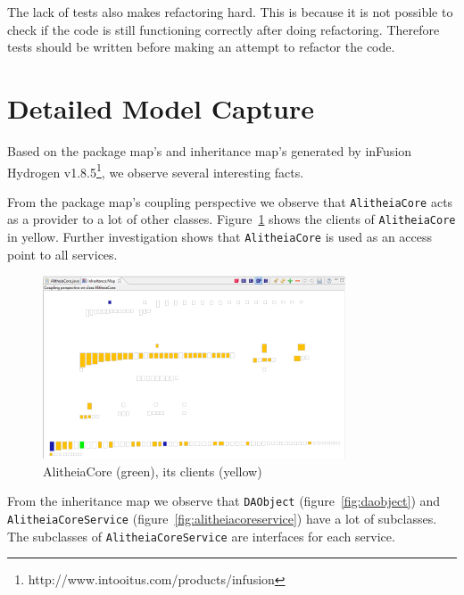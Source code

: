 \documentclass{article}
\begin{document}
The lack of tests also makes refactoring hard. This is because it is not possible to check if the code is still functioning correctly after doing refactoring. Therefore tests should be written before making an attempt to refactor the code.

\section{Detailed Model Capture}
Based on the package map's and inheritance map's generated by inFusion Hydrogen v1.8.5\footnote{http://www.intooitus.com/products/infusion}, we observe several interesting facts.

From the package map's coupling perspective we observe that \verb|AlitheiaCore| acts as a provider to a lot of other classes. Figure~\ref{fig:alitheiacore} shows the clients of \verb|AlitheiaCore| in yellow. Further investigation shows that \verb|AlitheiaCore| is used as an access point to all services.

\begin{figure}[h]
    \centering
    \includegraphics[width=0.8\textwidth]{alitheiacore-coupling}
    \caption{AlitheiaCore (green), its clients (yellow)}
    \label{fig:alitheiacore}
\end{figure}

From the inheritance map we observe that \verb|DAObject| (figure~\ref{fig:daobject}) and \verb|AlitheiaCoreService| (figure~\ref{fig:alitheiacoreservice}) have a lot of subclasses. The subclasses of \verb|AlitheiaCoreService| are interfaces for each service.
\end{document}
